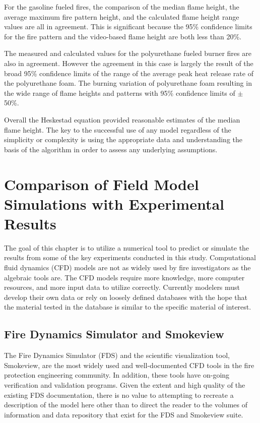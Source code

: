 \documentclass[twoside]{uocthesis}
\begin{document}
{For the gasoline fueled fires, the comparison of the median flame height, the average maximum fire pattern height, and the calculated flame height range values are all in agreement. This is significant because the 95\% confidence limits for the fire pattern and the video-based flame height are both less than 20\%.

The measured and calculated values for the polyurethane fueled burner fires are also in agreement.  However the agreement in this case is largely the result of the broad 95\% confidence limits of the range of the average peak heat release rate of the polyurethane foam.  The burning variation of polyurethane foam resulting in the wide range of flame heights and patterns with 95\% confidence limits of $\pm$ 50\%. 

Overall the Heskestad equation provided reasonable estimates of the median flame height.  The key to the successful use of any model regardless of the simplicity or complexity is using the appropriate data and understanding the basis of the algorithm in order to assess any underlying assumptions. 

\chapter{Comparison of Field Model Simulations with Experimental Results}

The goal of this chapter is to utilize a numerical tool to predict or simulate the results from some of the key experiments conducted in this study.  Computational fluid dynamics (CFD) models are not as widely used by fire investigators as the algebraic tools are.  The CFD models require more knowledge, more computer resources, and more input data to utilize correctly.  Currently modelers must develop their own data or rely on loosely defined databases with the hope that the material tested in the database is similar to the specific material of interest.       

\section{Fire Dynamics Simulator and Smokeview}

The Fire Dynamics Simulator (FDS) and the scientific visualization tool, Smokeview, are the most widely used and well-documented CFD tools in the fire protection engineering community. In addition, these tools have on-going verification and validation programs.  Given the extent and high quality of the existing FDS documentation, there is no value to attempting to recreate a description of the model here other than to direct the reader to the volumes of information and data repository that exist for the FDS and Smokeview suite.

}
\end{document}
